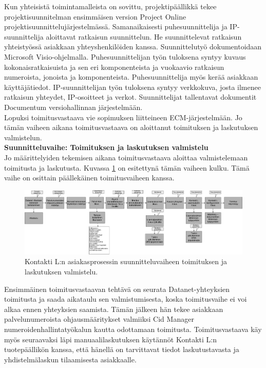 \documentclass[finnish,12pt,a4paper,pdftex]{article}
\begin{document}
\noindent Kun yhteisistä toimintamalleista on sovittu, projektipäällikkä tekee projektisuunnitelman ensimmäisen version Project Online projektisuunnittelujärjestelmässä. Samanaikaisesti puhesuunnittelija ja IP-suunnittelija aloittavat ratkaisun suunnittelun. He suunnittelevat ratkaisun yhteistyössä asiakkaan yhteyshenkilöiden kanssa. Suunnittelutyö dokumentoidaan Microsoft Visio-ohjelmalla. Puhesuunnittelijan työn tuloksena syntyy kuvaus kokonaisratkaisuista ja sen eri komponenteista ja vuokaavio ratkaisun numeroista, jonoista ja komponenteista. Puhesuunnittelija myös kerää asiakkaan käyttäjätiedot. IP-suunnittelijan työn tuloksena syntyy verkkokuva, josta ilmenee ratkaisun yhteydet, IP-osoitteet ja verkot. Suunnittelijat tallentavat dokumentit Documentum versiohallinnan järjestelmään.\\

\noindent Lopuksi toimitusvastaava vie sopimuksen liitteineen ECM-järjestelmään. Jo tämän vaiheen aikana toimitusvastaava on aloittanut toimituksen ja laskutuksen valmistelun.\\ 

\textbf{Suunnitteluvaihe: Toimituksen ja laskutuksen valmistelu}\\

\noindent Jo määrittelyiden tekemisen aikana toimitusvastaava aloittaa valmistelemaan toimitusta ja laskutusta. Kuvassa \ref{fig:valmtoimlask} on esitettynä tämän vaiheen kulku. Tämä vaihe on osittain päällekäinen toimitusvaiheen kanssa.

\begin{figure}[!h]
    \centering
    \includegraphics[scale=0.23]{images/valmtoimlask.pdf}
    \caption{Kontakti L:n asiakasprosessin suunnitteluvaiheen toimituksen ja laskutuksen valmistelu.}
    \label{fig:valmtoimlask}
\end{figure}

\noindent Ensimmäinen toimitusvastaavan tehtävä on seurata Datanet-yhteyksien toimitusta ja saada aikataulu sen valmistumisesta, koska toimitusvaihe ei voi alkaa ennen yhteyksien saamista. Tämän jälkeen hän tekee asiakkaan palvelunumeroista ohjausmääritykset valmiiksi Cid Manager numeroidenhallintatyökalun kautta odottamaan toimitusta. Toimitusvastaava käy myös seuraavaksi läpi manuaalilaskutuksen käytännöt Kontakti L:n tuotepäällikön kanssa, että hänellä on tarvittavat tiedot laskutustavasta ja yhdistelmälaskun tilaamisesta asiakkaalle.\\
\end{document}
